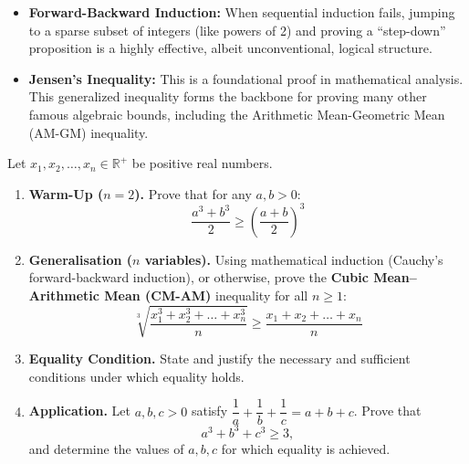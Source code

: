 \begin{takeaways}
\begin{itemize}[leftmargin=*]
    \item \textbf{Forward-Backward Induction:} When sequential induction fails, jumping to a sparse subset of integers (like powers of 2) and proving a ``step-down'' proposition is a highly effective, albeit unconventional, logical structure.
    \item \textbf{Jensen's Inequality:} This is a foundational proof in mathematical analysis. This generalized inequality forms the backbone for proving many other famous algebraic bounds, including the Arithmetic Mean-Geometric Mean (AM-GM) inequality.
\end{itemize}
\end{takeaways}

\begin{problem}
Let $x_1, x_2, \dots, x_n \in \mathbb{R}^+$ be positive real numbers.

\begin{enumerate}[leftmargin=*]
    \item[\textbf{(i)}] \textbf{Warm-Up ($n = 2$).} Prove that for any $a, b > 0$:
    \[
        \frac{a^3 + b^3}{2} \ge \left(\frac{a + b}{2}\right)^3
    \]

    \item[\textbf{(ii)}] \textbf{Generalisation ($n$ variables).} Using mathematical induction (Cauchy's forward-backward induction), or otherwise, prove the \textbf{Cubic Mean--Arithmetic Mean (CM-AM)} inequality for all $n \ge 1$:
    \[
        \sqrt[3]{\frac{x_1^3 + x_2^3 + \dots + x_n^3}{n}} \ge \frac{x_1 + x_2 + \dots + x_n}{n}
    \]

    \item[\textbf{(iii)}] \textbf{Equality Condition.} State and justify the necessary and sufficient conditions under which equality holds.

    \item[\textbf{(iv)}] \textbf{Application.} Let $a, b, c > 0$ satisfy $\dfrac{1}{a} + \dfrac{1}{b} + \dfrac{1}{c} = a + b + c$. Prove that
    \[
        a^3 + b^3 + c^3 \ge 3,
    \]
    and determine the values of $a, b, c$ for which equality is achieved.
\end{enumerate}
\end{problem}

